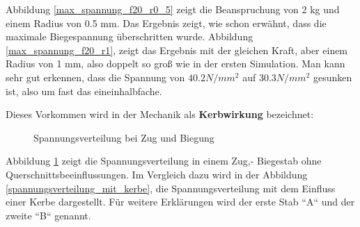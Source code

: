 	Abbildung \ref{max_spannung_f20_r0_5} zeigt die Beanspruchung von 2 kg und einem Radius von 0.5 mm.
	Das Ergebnis zeigt, wie schon erwähnt, dass die maximale Biegespannung überschritten wurde.
	Abbildung \ref{max_spannung_f20_r1}, zeigt das Ergebnis mit der gleichen Kraft, aber einem Radius von 1 mm, also doppelt so groß wie in der ersten Simulation.
	Man kann sehr gut erkennen, dass die Spannung von $40.2 N/mm^{2}$ auf $30.3 N/mm^{2}$ gesunken ist, also um fast das eineinhalbfache.

	Dieses Vorkommen wird in der Mechanik als \textbf{Kerbwirkung} bezeichnet:

			\begin{figure}[H]
				\begin{centering}
				\par\end{centering}
				\caption[Spannungsverteilung bei Zug und Biegung]{Spannungsverteilung bei Zug und Biegung\cite{spannungsverteilung}}
				\label{spannungsverteilung_ohne_kerbe}
			\end{figure}

	Abbildung \ref{spannungsverteilung_ohne_kerbe} zeigt die Spannungsverteilung in einem Zug,- \bzw Biegestab ohne Querschnittsbeeinflussungen.
	Im Vergleich dazu wird in der Abbildung \ref{spannungsverteilung_mit_kerbe}, die Spannungsverteilung mit dem Einfluss einer Kerbe dargestellt.
	Für weitere Erklärungen wird der erste Stab “A“ und der zweite “B“ genannt.

